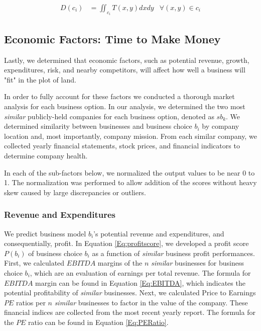 \documentclass{mcmthesis}
\begin{document}
\begin{align}
    D(c_i) & = \iint_{c_i} T(x, y) dx dy & \forall (x, y) \in c_i
    \label{Eq:deforestation}
\end{align}

\subsection{Economic Factors: Time to Make Money}
Lastly, we determined that economic factors, such as potential revenue, growth, expenditures, risk, and nearby competitors, will affect how well a business will "fit" in the plot of land.

In order to fully account for these factors we conducted a thorough market analysis for each business option. In our analysis, we determined the two most \textit{similar} publicly-held companies for each business option, denoted as $sb_k$. We determined similarity between businesses and business choice $b_i$ by company location and, most importantly, company mission. From each similar company, we collected yearly financial statements, stock prices, and financial indicators to determine company health.

In each of the sub-factors below, we normalized the output values to be near 0 to 1. The normalization was performed to allow addition of the scores without heavy skew caused by large discrepancies or outliers.

\subsubsection{Revenue and Expenditures}

We predict business model $b_i$'s potential revenue and expenditures, and consequentially, profit. In Equation \ref{Eq:profitscore}, we developed a profit score $P(b_i)$ of business choice $b_i$ as a function of \textit{similar} business profit performances. First, we calculated $EBITDA$ margins of the $n$ \textit{similar} businesses for business choice $b_i$, which are an evaluation of earnings per total revenue. The formula for $EBITDA$ margin can be found in Equation \ref{Eq:EBITDA}, which indicates the potential profitability of \textit{similar} businesses. Next, we calculated Price to Earnings $PE$ ratios per $n$ \textit{similar} businesses to factor in the value of the company. These financial indices are collected from the most recent yearly report. The formula for the $PE$ ratio can be found in Equation \ref{Eq:PERatio}.
\end{document}
